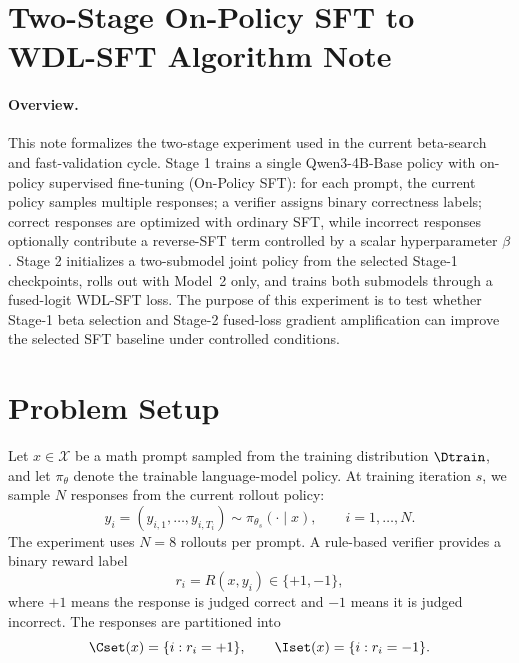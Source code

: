 
\section{Two-Stage On-Policy SFT to WDL-SFT Algorithm Note}
\label{sec:opsft-note}
\paragraph{Overview.}
This note formalizes the two-stage experiment used in the current beta-search
and fast-validation cycle. Stage 1 trains a single Qwen3-4B-Base policy with
on-policy supervised fine-tuning (On-Policy SFT): for each prompt, the current
policy samples multiple responses; a verifier assigns binary correctness
labels; correct responses are optimized with ordinary SFT, while incorrect
responses optionally contribute a reverse-SFT term controlled by a scalar
hyperparameter $\beta$. Stage 2 initializes a two-submodel joint policy from
the selected Stage-1 checkpoints, rolls out with Model~2 only, and trains both
submodels through a fused-logit WDL-SFT loss. The purpose of this experiment is
to test whether Stage-1 beta selection and Stage-2 fused-loss gradient
amplification can improve the selected SFT baseline under controlled
conditions.


\section{Problem Setup}
\label{sec:opsft-setup}

Let $x\in\mathcal{X}$ be a math prompt sampled from the training distribution
$\Dtrain$, and let $\pi_{\theta}$ denote the trainable language-model policy.
At training iteration $s$, we sample $N$ responses from the current rollout
policy:
\begin{equation}
    y_i=(y_{i,1},\ldots,y_{i,T_i})
    \sim \pi_{\theta_s}(\cdot\mid x),
    \qquad i=1,\ldots,N .
\end{equation}
The experiment uses $N=8$ rollouts per prompt. A rule-based verifier provides a
binary reward label
\begin{equation}
    r_i = R(x,y_i)\in\{+1,-1\},
\end{equation}
where $+1$ means the response is judged correct and $-1$ means it is judged
incorrect. The responses are partitioned into
\begin{equation}
    \Cset(x)=\{i:r_i=+1\},
    \qquad
    \Iset(x)=\{i:r_i=-1\}.
\end{equation}

